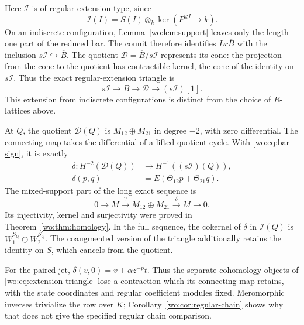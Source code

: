 Here \(\mathcal I\) is of regular-extension type, since
\[
 \mathcal I(I)=S(I)\otimes_k
      \ker(P^{\otimes I}\longrightarrow k).
\]
On an indiscrete configuration, Lemma~\ref{wo:lem:support} leaves
only the length-one part of the reduced bar.  The counit therefore
identifies \(Lr\overline B\) with the inclusion
\(s\mathcal I\hookrightarrow\overline B\).
The quotient
\(\mathcal D=\overline B/s\mathcal I\) represents its cone:
the projection from the cone to the quotient has contractible kernel,
the cone of the identity on \(s\mathcal I\).  Thus the exact
regular-extension triangle is
\begin{equation}\label{wo:eq:extension-triangle}
 s\mathcal I\longrightarrow\overline B\longrightarrow
 \mathcal D\longrightarrow(s\mathcal I)[1].
\end{equation}
This extension from indiscrete configurations is distinct from the
choice of \(R\)-lattices above.

At \(Q\), the quotient \(\mathcal D(Q)\) is
\(M_{12}\oplus M_{21}\) in degree \(-2\), with zero differential.
The connecting map takes the differential of a lifted quotient cycle.
With \eqref{wo:eq:bar-sign}, it is exactly
\begin{equation}\label{wo:eq:connecting-map}
 \begin{split}
 \delta:H^{-2}(\mathcal D(Q))&\longrightarrow
                      H^{-1}((s\mathcal I)(Q)),\\
 \delta(p,q)&=E(\Theta_{12}p+\Theta_{21}q).
 \end{split}
\end{equation}
The mixed-support part of the long exact sequence is
\begin{equation}\label{wo:eq:exact-sequence}
 0\longrightarrow M\xrightarrow{\gamma}
 M_{12}\oplus M_{21}\xrightarrow{\delta}M\longrightarrow0.
\end{equation}
Its injectivity, kernel and surjectivity were proved in
Theorem~\ref{wo:thm:homology}.  In the full sequence, the cokernel
of \(\delta\) in \(\mathcal I(Q)\) is
\(W_1^{S_Q}\oplus W_2^{S_Q}\).
The coaugmented version of the triangle additionally retains the
identity on \(S\), which cancels from the quotient.

For the paired jet,
\(\delta(v,0)=v+\alpha z^{-p}t\).  Thus the separate cohomology
objects of \eqref{wo:eq:extension-triangle} lose a contraction
which its connecting map retains, with the state coordinates and
regular coefficient modules fixed.  Meromorphic inverses trivialize
the row over \(K\); Corollary~\ref{wo:cor:regular-chain} shows
why that does not give the specified regular chain comparison.

